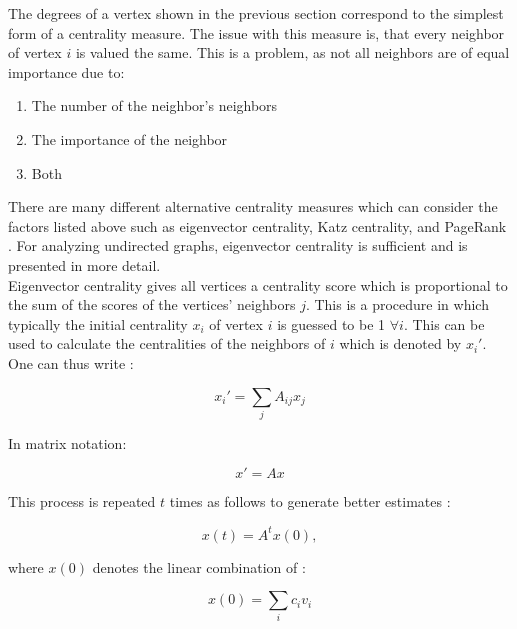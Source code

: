 	\noindent The degrees of a vertex shown in the previous section correspond 
	to the simplest form of a centrality measure. The issue with this measure 
	is, that every neighbor of vertex $i$ is valued the same. This is a 
	problem, as not all neighbors are of equal importance due to:

	\begin{enumerate}
		\item The number of the neighbor's neighbors
		\item The importance of the neighbor
		\item Both
	\end{enumerate}

	\noindent There are many different alternative centrality measures which
	can consider the factors listed above such as eigenvector centrality, Katz
	centrality, and PageRank
	\citep{landau1895relativen,katz1953new,page1999pagerank}. For analyzing 
	undirected graphs, eigenvector centrality is sufficient and is presented in 
	more detail.\\

	\noindent Eigenvector centrality gives all vertices a centrality score which 
	is proportional to the sum of the scores of the vertices' neighbors $j$. 
	This is a procedure in which typically the initial centrality $x_i$ of 
	vertex $i$ is guessed to be 1 $\forall i$. This can be used to calculate the 
	centralities of the neighbors of $i$ which is denoted by $x_{i}'$. One can 
	thus write \citep[p. 169]{Newman2010}:

	\begin{equation}
		x_i' = \sum_{j}A_{ij}x_j
	\end{equation}

	\noindent In matrix notation:

	\begin{equation}
		x' = Ax
	\end{equation}

	\noindent This process is repeated $t$ times as follows to generate better 
	estimates \citep[p. 170]{Newman2010}:

	\begin{equation}
		x(t) =  A^tx(0),
	\end{equation}

	where $x(0)$ denotes the linear combination of 
	\citep[p. 170]{Newman2010}:

	\begin{equation}
		x(0) =  \sum_{i}c_{i}v_{i}
	\end{equation}

